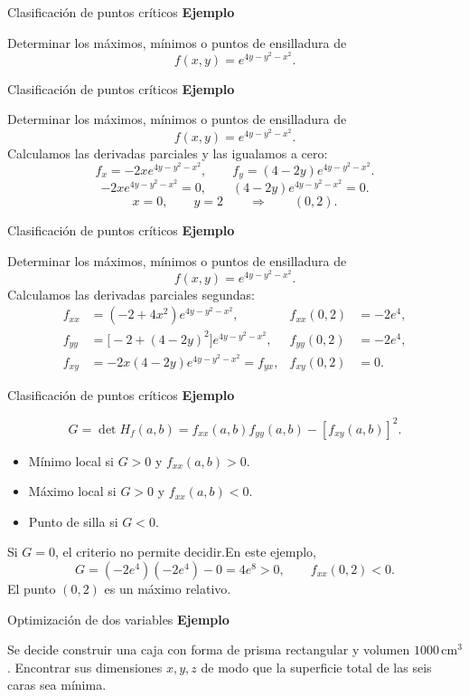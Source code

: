 \documentclass[main.tex]{subfiles}
\begin{document}
\begin{frame}{Clasificación de puntos críticos}
\textbf{Ejemplo}\par Determinar los máximos, mínimos o puntos de ensilladura de\[f(x,y)=e^{4y-y^2-x^2}.\]
\end{frame}
\begin{frame}{Clasificación de puntos críticos}
\small\textbf{Ejemplo}\par Determinar los máximos, mínimos o puntos de ensilladura de\[f(x,y)=e^{4y-y^2-x^2}.\]Calculamos las derivadas parciales y las igualamos a cero:
\[f_x=-2xe^{4y-y^2-x^2},\qquad f_y=(4-2y)e^{4y-y^2-x^2}.\]
\[-2xe^{4y-y^2-x^2}=0,\qquad(4-2y)e^{4y-y^2-x^2}=0.\]
\[x=0,\qquad y=2\qquad\Longrightarrow\qquad(0,2).\]
\end{frame}
\begin{frame}{Clasificación de puntos críticos}
\small\textbf{Ejemplo}\par Determinar los máximos, mínimos o puntos de ensilladura de\[f(x,y)=e^{4y-y^2-x^2}.\]Calculamos las derivadas parciales segundas:
\[\begin{aligned}
f_{xx}&=(-2+4x^2)e^{4y-y^2-x^2},&f_{xx}(0,2)&=-2e^4,\\
f_{yy}&=\bigl[-2+(4-2y)^2\bigr]e^{4y-y^2-x^2},&f_{yy}(0,2)&=-2e^4,\\
f_{xy}&=-2x(4-2y)e^{4y-y^2-x^2}=f_{yx},&f_{xy}(0,2)&=0.
\end{aligned}\]
\end{frame}
\begin{frame}{Clasificación de puntos críticos}
\small\textbf{Ejemplo}\par\[G=\det H_f(a,b)=f_{xx}(a,b)f_{yy}(a,b)-[f_{xy}(a,b)]^2.\]
\begin{itemize}
\item Mínimo local si $G>0$ y $f_{xx}(a,b)>0$.
\item Máximo local si $G>0$ y $f_{xx}(a,b)<0$.
\item Punto de silla si $G<0$.
\end{itemize}
Si $G=0$, el criterio no permite decidir.\medskip En este ejemplo,
\[G=(-2e^4)(-2e^4)-0=4e^8>0,\qquad f_{xx}(0,2)<0.\]
El punto $(0,2)$ es un máximo relativo.
\end{frame}
\begin{frame}{Optimización de dos variables}
\textbf{Ejemplo}\par Se decide construir una caja con forma de prisma rectangular y volumen $1000\,\mathrm{cm}^3$. Encontrar sus dimensiones $x,y,z$ de modo que la superficie total de las seis caras sea mínima.
\end{frame}
\end{document}
